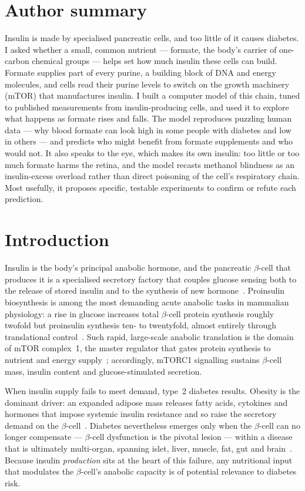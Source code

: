 \documentclass[10pt,letterpaper]{article}
\begin{document}
\section*{Author summary}
Insulin is made by specialised pancreatic cells, and too little of it causes
diabetes. I asked whether a small, common nutrient --- formate, the body's
carrier of one-carbon chemical groups --- helps set how much insulin these cells
can build. Formate supplies part of every purine, a building block of DNA and
energy molecules, and cells read their purine levels to switch on the growth
machinery (mTOR) that manufactures insulin. I built a computer model of this
chain, tuned to published measurements from insulin-producing cells, and used it
to explore what happens as formate rises and falls. The model reproduces puzzling
human data --- why blood formate can look high in some people with diabetes and
low in others --- and predicts who might benefit from formate supplements and who
would not. It also speaks to the eye, which makes its own insulin: too little or
too much formate harms the retina, and the model recasts methanol blindness as an
insulin-excess overload rather than direct poisoning of the cell's respiratory
chain. Most usefully, it proposes specific, testable experiments to confirm or
refute each prediction.

\clearpage
{}
\linenumbers

\section*{Introduction}
Insulin is the body's principal anabolic hormone, and
the pancreatic $\beta$-cell that produces it is a specialised secretory factory
that couples glucose sensing both to the release of stored insulin and to the
synthesis of new hormone~\cite{rorsman2018}. Proinsulin biosynthesis is
among the most demanding acute anabolic tasks in mammalian physiology: a rise in
glucose increases total $\beta$-cell protein synthesis roughly twofold but
proinsulin synthesis ten- to twentyfold, almost entirely through translational
control~\cite{itoh1980}. Such rapid, large-scale anabolic translation is
the domain of mTOR complex~1, the master regulator that gates protein synthesis to
nutrient and energy supply~\cite{saxton2017}; accordingly, mTORC1
signalling sustains $\beta$-cell mass, insulin content and glucose-stimulated
secretion.

When insulin supply fails to meet demand, type~2
diabetes results. Obesity is the dominant driver: an expanded adipose mass
releases fatty acids, cytokines and hormones that impose systemic insulin
resistance and so raise the secretory demand on the $\beta$-cell~\cite{kahn2006}. Diabetes nevertheless emerges only when the $\beta$-cell can
no longer compensate --- $\beta$-cell dysfunction is the pivotal lesion --- within
a disease that is ultimately multi-organ, spanning islet, liver, muscle, fat, gut
and brain~\cite{defronzo2009,roden2019}. Because insulin
\emph{production} sits at the heart of this failure, any nutritional input that
modulates the $\beta$-cell's anabolic capacity is of potential relevance to
diabetes risk.
\end{document}
